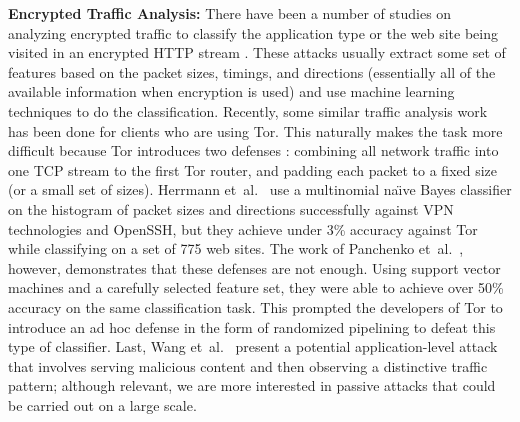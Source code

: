 \smallskip\noindent\textbf{Encrypted Traffic Analysis:} There have
been a number of studies on analyzing encrypted traffic to classify
the application type \cite{a-classify} or the web site being visited
in an encrypted HTTP stream
\cite{a-enchttp-leak,a-fingerprint,a-statistical-id}. These attacks
usually extract some set of features based on the packet sizes,
timings, and directions (essentially all of the available information
when encryption is used) and use machine learning techniques to do the
classification. 
Recently, some similar traffic analysis work has been done for clients
who are using Tor. This naturally makes the task more difficult
because Tor introduces two defenses \cite{c-tor}: combining all
network traffic into one TCP stream to the first Tor router, and
padding each packet to a fixed size (or a small set of
sizes). Herrmann et~al.~\cite{a-multinomial} use a multinomial
na\"{\i}ve Bayes classifier on the histogram of packet sizes and
directions successfully against VPN technologies and OpenSSH, but they
achieve under 3\% accuracy against Tor while classifying on a set of
775 web sites. The work of Panchenko et~al.~\cite{a-finger-onion},
however, demonstrates that these defenses are not enough. Using
support vector machines and a carefully selected feature set, they
were able to achieve over 50\% accuracy on the same classification
task. This prompted the developers of Tor to introduce an ad hoc
defense in the form of randomized pipelining \cite{c-random-pipe}
to defeat this type of classifier. Last, Wang
et~al.~\cite{a-active-http} present a potential application-level
attack that involves serving malicious content and then observing a
distinctive traffic pattern; although relevant, we are more interested
in passive attacks that could be carried out on a large scale.

